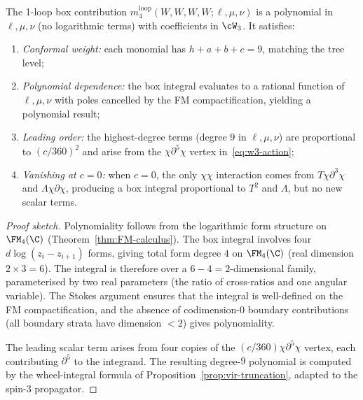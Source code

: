 \begin{proposition}
\label{prop:m4-box}
The 1-loop box contribution $m_4^{\mathrm{loop}}(W,W,W,W;\ell,\mu,\nu)$
is a polynomial in $\ell, \mu, \nu$ (no logarithmic terms) with
coefficients in $\cW_3$. It satisfies:
\begin{enumerate}
\item \emph{Conformal weight:} each monomial has
$h + a + b + c = 9$, matching the tree level;
\item \emph{Polynomial dependence:} the box integral evaluates to
a rational function of $\ell, \mu, \nu$ with poles cancelled by
the FM compactification, yielding a polynomial result;
\item \emph{Leading order:} the highest-degree terms (degree $9$
in $\ell,\mu,\nu$) are proportional to $(c/360)^2$ and arise
from the $\chi\partial^5\chi$ vertex in~\eqref{eq:w3-action};
\item \emph{Vanishing at $c = 0$:} when $c = 0$, the only
$\chi\chi$ interaction comes from $T\chi\partial^3\chi$
and $\Lambda\chi\partial\chi$, producing a box integral
proportional to $T^2$ and $\Lambda$, but no new scalar terms.
\end{enumerate}
\end{proposition}

\begin{proof}[Proof sketch]
Polynomiality follows from the logarithmic form structure on
$\FM_4(\C)$ (Theorem~\ref{thm:FM-calculus}). The box integral
involves four $d\log(z_i - z_{i+1})$ forms, giving total
form degree $4$ on $\FM_4(\C)$ (real dimension $2 \times 3 = 6$).
The integral is therefore over a $6-4 = 2$-dimensional family,
parameterised by two real parameters (the ratio of cross-ratios
and one angular variable). The Stokes argument ensures
that the integral is well-defined on the FM compactification,
and the absence of codimension-$0$ boundary contributions
(all boundary strata have dimension $< 2$) gives polynomiality.

The leading scalar term arises from four copies of the
$(c/360)\chi\partial^5\chi$ vertex, each contributing
$\partial^5$ to the integrand. The resulting degree-$9$
polynomial is computed by the wheel-integral formula of
Proposition~\ref{prop:vir-truncation}, adapted to the
spin-$3$ propagator.
\end{proof}

